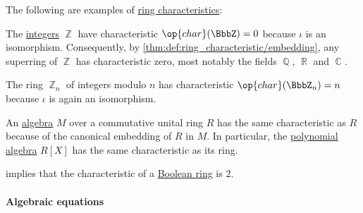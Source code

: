 \begin{example}\label{ex:def:ring_characteristic}
  The following are examples of \hyperref[def:ring_characteristic]{ring characteristics}:
  \begin{thmenum}
     The \hyperref[def:integers]{integers} \( \BbbZ \) have characteristic \( \op{char}(\BbbZ) = 0 \) because \( \iota \) is an isomorphism. Consequently, by \cref{thm:def:ring_characteristic/embedding}, any superring of \( \BbbZ \) has characteristic zero, most notably the fields \( \BbbQ \), \( \BbbR \) and \( \BbbC \).

     The ring \hyperref[def:ring_of_integers_modulo]{\( \BbbZ_n \)} of integers modulo \( n \) has characteristic \( \op{char}(\BbbZ_n) = n \) because \( \iota \) is again an isomorphism.

     An \hyperref[def:algebra_over_ring]{algebra} \( M \) over a commutative unital ring \( R \) has the same characteristic as \( R \) because of the canonical embedding of \( R \) in \( M \). In particular, the \hyperref[def:polynomial_algebra]{polynomial algebra} \( R[X] \) has the same characteristic as its ring.

      implies that the characteristic of a \hyperref[def:boolean_ring]{Boolean ring} is \( 2 \).
  \end{thmenum}
\end{example}

\paragraph{Algebraic equations}

